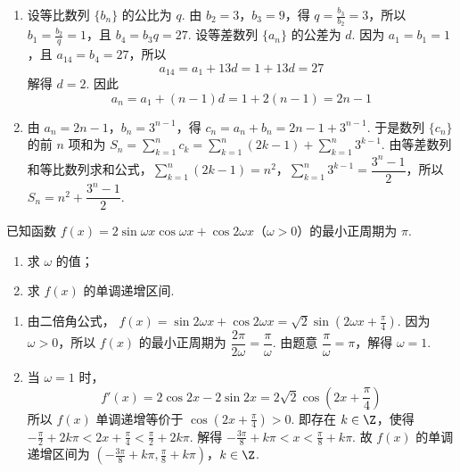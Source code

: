 \begin{solution}
\begin{enumerate}
\item 设等比数列 \(\{b_n\}\) 的公比为 \(q\). 由 \(b_2=3\)，\(b_3=9\)，得 \(q=\frac{b_3}{b_2}=3\)，所以 \(b_1=\frac{b_2}{q}=1\)，且 \(b_4=b_3q=27\).
设等差数列 \(\{a_n\}\) 的公差为 \(d\). 因为 \(a_1=b_1=1\)，且 \(a_{14}=b_4=27\)，所以
\[
a_{14}=a_1+13d=1+13d=27
\]
解得 \(d=2\). 因此
\[
a_n=a_1+(n-1)d=1+2(n-1)=2n-1
\]

\item 由 \(a_n=2n-1\)，\(b_n=3^{n-1}\)，得
\(c_n=a_n+b_n=2n-1+3^{n-1}\).
于是数列 \(\{c_n\}\) 的前 \(n\) 项和为 \(S_n=\sum_{k=1}^{n}c_k=\sum_{k=1}^{n}(2k-1)+\sum_{k=1}^{n}3^{k-1}\). 由等差数列和等比数列求和公式，\(\sum_{k=1}^{n}(2k-1)=n^2\)，\(\sum_{k=1}^{n}3^{k-1}=\dfrac{3^n-1}{2}\)，所以 \(S_n=n^2+\dfrac{3^n-1}{2}\).
\end{enumerate}
\end{solution}

\begin{problem}
已知函数 \(f(x)=2\sin\omega x\cos\omega x+\cos2\omega x\)（\(\omega>0\)）的最小正周期为 \(\pi\).

\begin{enumerate}
\item 求 \(\omega\) 的值；
\item 求 \(f(x)\) 的单调递增区间.
\end{enumerate}
\end{problem}

\begin{solution}
\begin{enumerate}
\item 由二倍角公式，
\(f(x)=\sin2\omega x+\cos2\omega x=\sqrt2\sin\left(2\omega x+\frac{\pi}{4}\right)\).
因为 \(\omega>0\)，所以 \(f(x)\) 的最小正周期为 \(\dfrac{2\pi}{2\omega}=\dfrac{\pi}{\omega}\). 由题意 \(\dfrac{\pi}{\omega}=\pi\)，解得 \(\omega=1\).

\item 当 \(\omega=1\) 时，
\[
f'(x)=2\cos2x-2\sin2x=2\sqrt2\cos\left(2x+\frac{\pi}{4}\right)
\]
所以 \(f(x)\) 单调递增等价于 \(\cos\left(2x+\frac{\pi}{4}\right)>0\).
即存在 \(k\in\Z\)，使得
\(-\frac{\pi}{2}+2k\pi<2x+\frac{\pi}{4}<\frac{\pi}{2}+2k\pi\).
解得
\(-\frac{3\pi}{8}+k\pi<x<\frac{\pi}{8}+k\pi\). 故 \(f(x)\) 的单调递增区间为 \(\left(-\frac{3\pi}{8}+k\pi,\frac{\pi}{8}+k\pi\right)\)，\(k\in\Z\).
\end{enumerate}
\end{solution}

